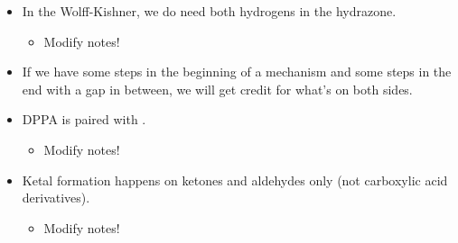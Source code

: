 \documentclass[../notes.tex]{subfiles}
\begin{document}
\begin{itemize}
\begin{itemize}
    \end{itemize}
    \item In the Wolff-Kishner, we do need both hydrogens in the hydrazone.
    \begin{itemize}
        \item Modify notes!
    \end{itemize}
    \item If we have some steps in the beginning of a mechanism and some steps in the end with a gap in between, we will get credit for what's on both sides.
    \item DPPA is paired with .
    \begin{itemize}
        \item Modify notes!
    \end{itemize}
    \item Ketal formation happens on ketones and aldehydes only (not carboxylic acid derivatives).
    \begin{itemize}
        \item Modify notes!
    \end{itemize}
\end{itemize}
\end{document}
